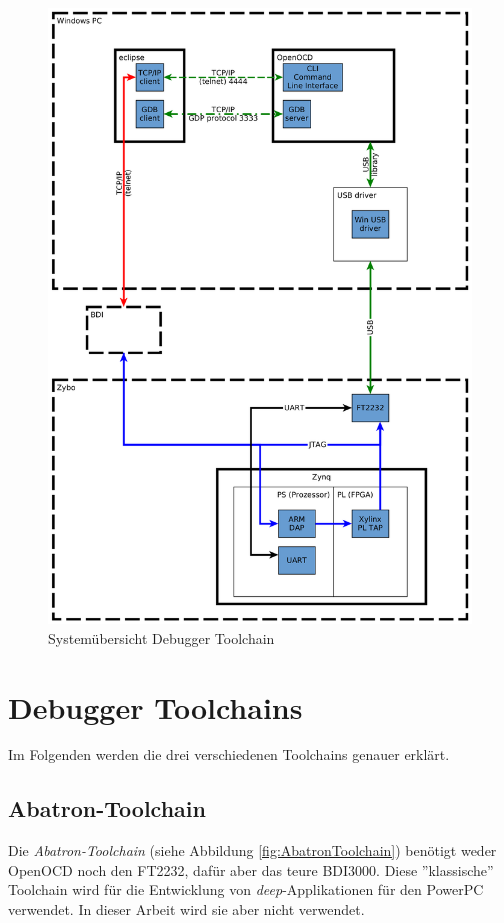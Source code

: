 \begin{figure}[htbp]
	\centering
		\includegraphics[width=\textwidth,height=\textheight,keepaspectratio]{graphs/embeddedDebuggerToolchain.png}
	\caption{Systemübersicht Debugger Toolchain}
	\label{fig:UebersichtDebuggerToolchain}
\end{figure}


\FloatBarrier
\section{Debugger Toolchains}
Im Folgenden werden die drei verschiedenen Toolchains genauer erklärt.

\subsection{Abatron-Toolchain}
Die \textit{Abatron-Toolchain} (siehe Abbildung \ref{fig:AbatronToolchain}) benötigt weder OpenOCD noch den FT2232, dafür aber das teure BDI3000.
Diese ''klassische'' Toolchain wird für die Entwicklung von \textit{deep}-Applikationen für den PowerPC verwendet.
In dieser Arbeit wird sie aber nicht verwendet.

